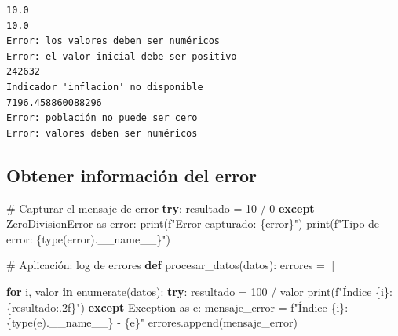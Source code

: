 \documentclass[
  doc,
  floatsintext,
  longtable,
  a4paper,
  nolmodern,
  notxfonts,
  notimes,
  12pt,
  colorlinks=true,linkcolor=blue,citecolor=blue,urlcolor=blue]{apa7}
\newenvironment{Shaded}{\begin{snugshade}}{\end{snugshade}}
\newcommand{\BuiltInTok}[1]{\textcolor[rgb]{0.00,0.23,0.31}{#1}}
\newcommand{\CommentTok}[1]{\textcolor[rgb]{0.37,0.37,0.37}{#1}}
\newcommand{\ControlFlowTok}[1]{\textcolor[rgb]{0.00,0.23,0.31}{\textbf{#1}}}
\newcommand{\DecValTok}[1]{\textcolor[rgb]{0.68,0.00,0.00}{#1}}
\newcommand{\ImportTok}[1]{\textcolor[rgb]{0.00,0.46,0.62}{#1}}
\newcommand{\KeywordTok}[1]{\textcolor[rgb]{0.00,0.23,0.31}{\textbf{#1}}}
\newcommand{\NormalTok}[1]{\textcolor[rgb]{0.00,0.23,0.31}{#1}}
\newcommand{\OperatorTok}[1]{\textcolor[rgb]{0.37,0.37,0.37}{#1}}
\newcommand{\PreprocessorTok}[1]{\textcolor[rgb]{0.68,0.00,0.00}{#1}}
\newcommand{\SpecialCharTok}[1]{\textcolor[rgb]{0.37,0.37,0.37}{#1}}
\newcommand{\SpecialStringTok}[1]{\textcolor[rgb]{0.13,0.47,0.30}{#1}}
\newcommand{\VariableTok}[1]{\textcolor[rgb]{0.07,0.07,0.07}{#1}}
\begin{document}
\begin{verbatim}
10.0
10.0
Error: los valores deben ser numéricos
Error: el valor inicial debe ser positivo
242632
Indicador 'inflacion' no disponible
7196.458860088296
Error: población no puede ser cero
Error: valores deben ser numéricos
\end{verbatim}

\subsection{Obtener información del
error}\label{obtener-informaciuxf3n-del-error}

\begin{Shaded}
\begin{Highlighting}[]
\CommentTok{\# Capturar el mensaje de error}
\ControlFlowTok{try}\NormalTok{:}
\NormalTok{    resultado }\OperatorTok{=} \DecValTok{10} \OperatorTok{/} \DecValTok{0}
\ControlFlowTok{except} \PreprocessorTok{ZeroDivisionError} \ImportTok{as}\NormalTok{ error:}
    \BuiltInTok{print}\NormalTok{(}\SpecialStringTok{f"Error capturado: }\SpecialCharTok{\{}\NormalTok{error}\SpecialCharTok{\}}\SpecialStringTok{"}\NormalTok{)}
    \BuiltInTok{print}\NormalTok{(}\SpecialStringTok{f"Tipo de error: }\SpecialCharTok{\{}\BuiltInTok{type}\NormalTok{(error)}\SpecialCharTok{.}\VariableTok{\_\_name\_\_}\SpecialCharTok{\}}\SpecialStringTok{"}\NormalTok{)}

\CommentTok{\# Aplicación: log de errores}
\KeywordTok{def}\NormalTok{ procesar\_datos(datos):}
\NormalTok{    errores }\OperatorTok{=}\NormalTok{ []}
    
    \ControlFlowTok{for}\NormalTok{ i, valor }\KeywordTok{in} \BuiltInTok{enumerate}\NormalTok{(datos):}
        \ControlFlowTok{try}\NormalTok{:}
\NormalTok{            resultado }\OperatorTok{=} \DecValTok{100} \OperatorTok{/}\NormalTok{ valor}
            \BuiltInTok{print}\NormalTok{(}\SpecialStringTok{f"Índice }\SpecialCharTok{\{}\NormalTok{i}\SpecialCharTok{\}}\SpecialStringTok{: }\SpecialCharTok{\{}\NormalTok{resultado}\SpecialCharTok{:.2f\}}\SpecialStringTok{"}\NormalTok{)}
        \ControlFlowTok{except} \PreprocessorTok{Exception} \ImportTok{as}\NormalTok{ e:}
\NormalTok{            mensaje\_error }\OperatorTok{=} \SpecialStringTok{f"Índice }\SpecialCharTok{\{}\NormalTok{i}\SpecialCharTok{\}}\SpecialStringTok{: }\SpecialCharTok{\{}\BuiltInTok{type}\NormalTok{(e)}\SpecialCharTok{.}\VariableTok{\_\_name\_\_}\SpecialCharTok{\}}\SpecialStringTok{ {-} }\SpecialCharTok{\{}\NormalTok{e}\SpecialCharTok{\}}\SpecialStringTok{"}
\NormalTok{            errores.append(mensaje\_error)}
    

\end{Highlighting}
\end{Shaded}
\end{document}
